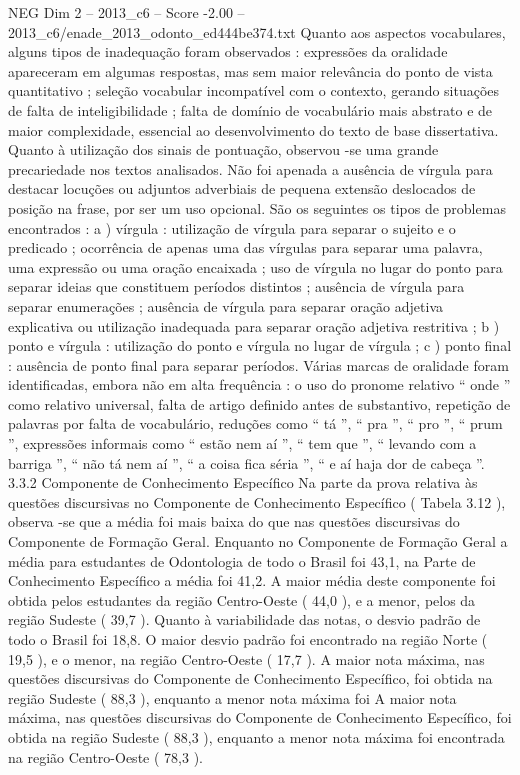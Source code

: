 \begin{textsample}{NEG Dim 2 – 2013\_c6 – Score -2.00 – 2013\_c6/enade\_2013\_odonto\_ed444be374.txt}
Quanto aos aspectos vocabulares, alguns tipos de inadequação foram observados : expressões da oralidade apareceram em algumas respostas, mas sem maior relevância do ponto de vista quantitativo ; seleção vocabular incompatível com o contexto, gerando situações de falta de inteligibilidade ; falta de domínio de vocabulário mais abstrato e de maior complexidade, essencial ao desenvolvimento do texto de base dissertativa.
Quanto à utilização dos sinais de pontuação, observou -se uma grande precariedade nos textos analisados.
Não foi apenada a ausência de vírgula para destacar locuções ou adjuntos adverbiais de pequena extensão deslocados de posição na frase, por ser um uso opcional.
São os seguintes os tipos de problemas encontrados : a ) vírgula : utilização de vírgula para separar o sujeito e o predicado ; ocorrência de apenas uma das vírgulas para separar uma palavra, uma expressão ou uma oração encaixada ; uso de vírgula no lugar do ponto para separar ideias que constituem períodos distintos ; ausência de vírgula para separar enumerações ; ausência de vírgula para separar oração adjetiva explicativa ou utilização inadequada para separar oração adjetiva restritiva ; b ) ponto e vírgula : utilização do ponto e vírgula no lugar de vírgula ; c ) ponto final : ausência de ponto final para separar períodos.
Várias marcas de oralidade foram identificadas, embora não em alta frequência : o uso do pronome relativo “ onde ” como relativo universal, falta de artigo definido antes de substantivo, repetição de palavras por falta de vocabulário, reduções como “ tá ”, “ pra ”, “ pro ”, “ prum ”, expressões informais como “ estão nem aí ”, “ tem que ”, “ levando com a barriga ”, “ não tá nem aí ”, “ a coisa fica séria ”, “ e aí haja dor de cabeça ”. 3.3.2 Componente de Conhecimento Específico Na parte da prova relativa às questões discursivas no Componente de Conhecimento Específico ( Tabela 3.12 ), observa -se que a média foi mais baixa do que nas questões discursivas do Componente de Formação Geral.
Enquanto no Componente de Formação Geral a média para estudantes de Odontologia de todo o Brasil foi 43,1, na Parte de Conhecimento Específico a média foi 41,2.
A maior média deste componente foi obtida pelos estudantes da região Centro-Oeste ( 44,0 ), e a menor, pelos da região Sudeste ( 39,7 ).
Quanto à variabilidade das notas, o desvio padrão de todo o Brasil foi 18,8.
O maior desvio padrão foi encontrado na região Norte ( 19,5 ), e o menor, na região Centro-Oeste ( 17,7 ).
A maior nota máxima, nas questões discursivas do Componente de Conhecimento Específico, foi obtida na região Sudeste ( 88,3 ), enquanto a menor nota máxima foi A maior nota máxima, nas questões discursivas do Componente de Conhecimento Específico, foi obtida na região Sudeste ( 88,3 ), enquanto a menor nota máxima foi encontrada na região Centro-Oeste ( 78,3 ).

\end{textsample}
